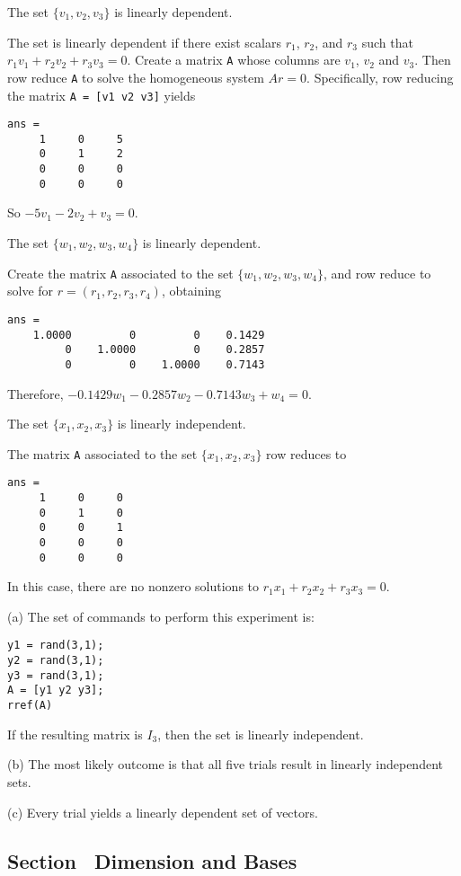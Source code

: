  \ans The set $\{v_1,v_2,v_3\}$ is linearly dependent.

\soln The set is linearly dependent if there exist scalars $r_1$, $r_2$,
and $r_3$ such that $r_1v_1 + r_2v_2 + r_3v_3 = 0$.  Create a matrix
{\tt A} whose columns are $v_1$, $v_2$ and $v_3$.  Then row reduce
{\tt A} to solve the homogeneous system $Ar = 0$.  Specifically, row
reducing the matrix {\tt A = [v1 v2 v3]} yields
\begin{verbatim}
ans =
     1     0     5
     0     1     2
     0     0     0
     0     0     0
\end{verbatim}
So $-5v_1 - 2v_2 + v_3 = 0$.

 \ans The set $\{w_1,w_2,w_3,w_4\}$ is linearly dependent.

\soln Create the matrix {\tt A} associated to the set
$\{w_1,w_2,w_3,w_4\}$, and row reduce to solve for
$r = (r_1,r_2,r_3,r_4)$, obtaining
\begin{verbatim}
ans =
    1.0000         0         0    0.1429
         0    1.0000         0    0.2857
         0         0    1.0000    0.7143
\end{verbatim}
Therefore, $-0.1429w_1 - 0.2857w_2 - 0.7143w_3 + w_4 = 0$.

 \ans The set $\{x_1,x_2,x_3\}$ is linearly independent.

\soln The matrix {\tt A} associated to the set $\{x_1,x_2,x_3\}$ row
reduces to
\begin{verbatim}
ans =
     1     0     0
     0     1     0
     0     0     1
     0     0     0
     0     0     0
\end{verbatim}
In this case, there are no nonzero solutions to
$r_1x_1 + r_2x_2 + r_3x_3 = 0$.
 
(a) The set of commands to perform this experiment is:
\begin{verbatim}
y1 = rand(3,1);
y2 = rand(3,1);
y3 = rand(3,1);
A = [y1 y2 y3];
rref(A)
\end{verbatim}
If the resulting matrix is $I_3$, then the set is linearly
independent.

(b) The most likely outcome is that all five trials result in
linearly independent sets.

(c) Every trial yields a linearly dependent set of vectors.


\subsection*{Section~\protect{\ref{S:5.5}} Dimension and Bases}

